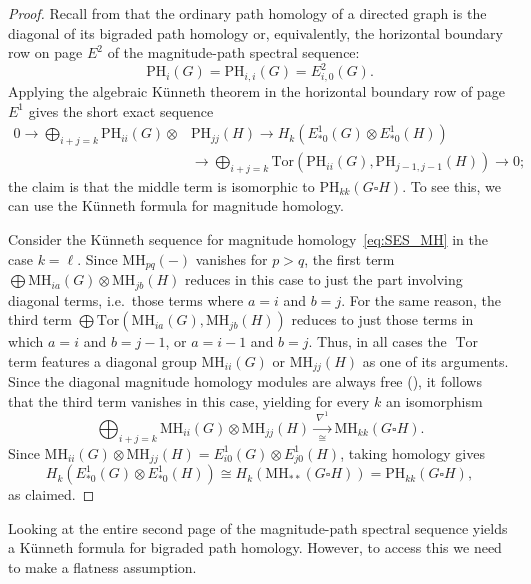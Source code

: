 \documentclass[a4paper, 11 pt, oneside, reqno]{amsart}
\numberwithin{lemma}{section}
\theoremstyle{definition}
\DeclareMathOperator{\tor}{Tor}
\newcommand{\MH}{\mathrm{MH}}
\newcommand{\PH}{\mathrm{PH}}
\newcommand{\OPH}{\mathrm{PH}}
\begin{document}
\begin{proof}
    Recall from 
    that the ordinary path homology of a directed graph is the diagonal of its bigraded path homology or, equivalently, the horizontal boundary row on page \(E^2\) of the magnitude-path spectral sequence:
    \[\OPH_i(G) = \PH_{i,i}(G) = E^2_{i,0}(G).\]
    Applying the algebraic K\"unneth theorem in the horizontal boundary row of page \(E^1\) gives the short exact sequence
    \begin{equation*}
    \begin{split}
    0 \to \bigoplus_{i+j = k} \PH_{ii}(G) \otimes & \PH_{jj}(H) \to H_k \left( E_{\ast 0}^1(G) \otimes E_{\ast 0}^1(H) \right) \\
    & \to \bigoplus_{i+j=k} \mathrm{Tor}(\PH_{ii}(G),\PH_{j-1,j-1}(H)) \to 0;
    \end{split}
    \end{equation*}
    the claim is that the middle term is isomorphic to \(\PH_{kk}(G \square H)\). To see this, we can use the K\"unneth formula for magnitude homology.

    Consider the K\"unneth sequence for magnitude
    homology~\eqref{eq:SES_MH} in the case $k=\ell$.
    Since $\MH_{pq}(-)$ vanishes for $p>q$, 
    the first term
    $\bigoplus \MH_{ia}(G) \otimes \MH_{jb}(H)$
    reduces in this case to just the part involving diagonal terms, 
    i.e.~those terms where $a=i$ and $b=j$.
    For the same reason, the third term
    $\bigoplus
    \mathrm{Tor}(\MH_{ia}(G),\MH_{jb}(H))$
    reduces to just those terms in which $a=i$ and $b=j-1$,
    or $a=i-1$ and $b=j$.
    Thus, in all cases the $\tor$ term features 
    a diagonal group $\MH_{ii}(G)$ or $\MH_{jj}(H)$ 
    as one of its arguments.
    Since the diagonal magnitude homology modules are always free (), it follows that the third term vanishes in this case,
    yielding for every $k$ an isomorphism
    \begin{equation*}
    \bigoplus_{i+j=k} \MH_{ii}(G) \otimes \MH_{jj}(H) 
    \xrightarrow[\cong]{\ \nabla^1\ }
    \MH_{kk}(G \square H).
    \end{equation*}
    Since \(\MH_{ii}(G) \otimes \MH_{jj}(H) = E^1_{i0}(G) \otimes E^1_{j0}(H)\), taking homology gives
    \[H_k \left( E^1_{\ast 0}(G) \otimes E^1_{\ast 0}(H) \right) \cong H_k \left( \MH_{\ast \ast} (G \square H) \right) = \PH_{kk}(G \square H),\]
    as claimed.
\end{proof}

Looking at the entire second page of the magnitude-path spectral sequence yields a K\"unneth formula for bigraded path homology.
However, to access this we need to make a flatness
assumption.
\end{document}
